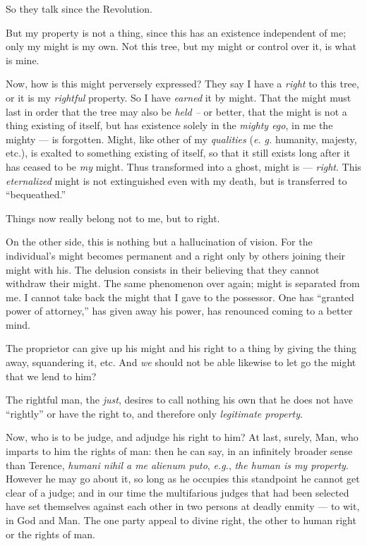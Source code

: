 So they talk since the Revolution.

But my property is not a thing, since this has an existence independent of me; 
only my might is my own. Not this tree, but my might or control over it, is 
what is mine.

Now, how is this might perversely expressed? They say I have a \textit{right} 
to this tree, or it is my \textit{rightful} property. So I have 
\textit{earned} it by might. That the might must last in order that the tree 
may also be \textit{held --} or better, that the might is not a thing existing 
of itself, but has existence solely in the \textit{mighty ego}, in me the 
mighty --- is forgotten. Might, like other of my \textit{qualities} (\textit{e. 
g.} humanity, majesty, etc.), is exalted to something existing of itself, so 
that it still exists long after it has ceased to be \textit{my} might. Thus 
transformed into a ghost, might is --- \textit{right}. This 
\textit{eternalized} might is not extinguished even with my death, but is 
transferred to ``bequeathed.''

Things now really belong not to me, but to right.

On the other side, this is nothing but a hallucination of vision. For the 
individual's might becomes permanent and a right only by others joining their 
might with his. The delusion consists in their believing that they cannot 
withdraw their might. The same phenomenon over again; might is separated from 
me. I cannot take back the might that I gave to the possessor. One has 
``granted power of attorney,'' has given away his power, has renounced 
coming to a better mind.

The proprietor can give up his might and his right to a thing by giving the 
thing away, squandering it, etc. And \textit{we} should not be able likewise 
to let go the might that we lend to him?

The rightful man, the \textit{just}, desires to call nothing his own that he 
does not have ``rightly'' or have the right to, and therefore only 
\textit{legitimate property}.

Now, who is to be judge, and adjudge his right to him? At last, surely, Man, 
who imparts to him the rights of man: then he can say, in an infinitely 
broader sense than Terence, \textit{humani nihil a me alienum puto}, 
\textit{e.g.}, \textit{the human is my property}. However he may go about it, 
so long as he occupies this standpoint he cannot get clear of a judge; and in 
our time the multifarious judges that had been selected have set themselves 
against each other in two persons at deadly enmity --- to wit, in God and Man. 
The one party appeal to divine right, the other to human right or the rights 
of man.

